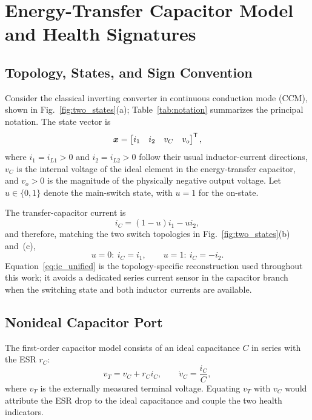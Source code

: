 ﻿\section{Energy-Transfer Capacitor Model and Health Signatures}
\label{sec:modeling}

\subsection{Topology, States, and Sign Convention}

Consider the classical inverting \Cuk{} converter in continuous conduction mode (CCM), shown in Fig.~\ref{fig:two_states}(a); Table~\ref{tab:notation} summarizes the principal notation. The state vector is
\begin{equation}
\bm{x}=\begin{bmatrix}i_1&i_2&v_C&v_o\end{bmatrix}^{\mathsf T},
\label{eq:state_vector}
\end{equation}
where $i_1=i_{L1}>0$ and $i_2=i_{L2}>0$ follow their usual inductor-current directions, $v_C$ is the internal voltage of the ideal element in the energy-transfer capacitor, and $v_o>0$ is the magnitude of the physically negative output voltage. Let $u\in\{0,1\}$ denote the main-switch state, with $u=1$ for the on-state.

The transfer-capacitor current is
\begin{equation}
i_C=(1-u)i_1-ui_2,
\label{eq:ic_unified}
\end{equation}
and therefore, matching the two switch topologies in Fig.~\ref{fig:two_states}(b) and~(c),
\begin{equation}
u=0:\ i_C=i_1, \qquad u=1:\ i_C=-i_2.
\label{eq:ic_states}
\end{equation}
Equation~\eqref{eq:ic_unified} is the topology-specific reconstruction used throughout this work; it avoids a dedicated series current sensor in the capacitor branch when the switching state and both inductor currents are available.

\subsection{Nonideal Capacitor Port}

The first-order capacitor model consists of an ideal capacitance $C$ in series with the ESR $r_C$:
\begin{equation}
v_T=v_C+r_C i_C, \qquad \dot v_C=\frac{i_C}{C},
\label{eq:cap_port}
\end{equation}
where $v_T$ is the externally measured terminal voltage. Equating $v_T$ with $v_C$ would attribute the ESR drop to the ideal capacitance and couple the two health indicators.

